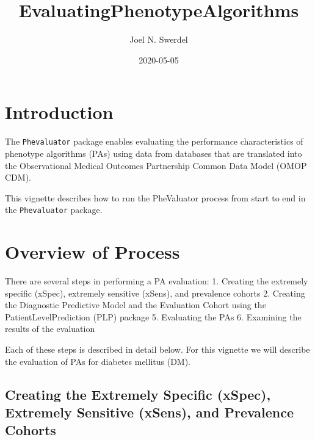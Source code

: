 \documentclass[
]{article}
\title{EvaluatingPhenotypeAlgorithms}
\author{Joel N. Swerdel}
\date{2020-05-05}
\begin{document}
\maketitle

{
\setcounter{tocdepth}{3}
\tableofcontents
}
\newpage

\hypertarget{introduction}{%
\section{Introduction}\label{introduction}}

The \texttt{Phevaluator} package enables evaluating the performance
characteristics of phenotype algorithms (PAs) using data from databases
that are translated into the Observational Medical Outcomes Partnership
Common Data Model (OMOP CDM).

This vignette describes how to run the PheValuator process from start to
end in the \texttt{Phevaluator} package.

\hypertarget{overview-of-process}{%
\section{Overview of Process}\label{overview-of-process}}

There are several steps in performing a PA evaluation: 1. Creating the
extremely specific (xSpec), extremely sensitive (xSens), and prevalence
cohorts 2. Creating the Diagnostic Predictive Model and the Evaluation
Cohort using the PatientLevelPrediction (PLP) package 5. Evaluating the
PAs 6. Examining the results of the evaluation

Each of these steps is described in detail below. For this vignette we
will describe the evaluation of PAs for diabetes mellitus (DM).

\hypertarget{creating-the-extremely-specific-xspec-extremely-sensitive-xsens-and-prevalence-cohorts}{%
\subsection{Creating the Extremely Specific (xSpec), Extremely Sensitive
(xSens), and Prevalence
Cohorts}\label{creating-the-extremely-specific-xspec-extremely-sensitive-xsens-and-prevalence-cohorts}}
\end{document}
